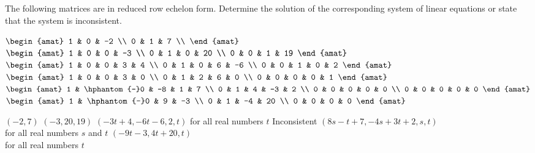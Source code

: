 
\begin{Exercise}[
name={},
title={}, 
difficulty=0,
origin={\cite{SZ}}]
The following matrices are in reduced row echelon form.  Determine the solution of the corresponding system of linear equations or state that the system is inconsistent.  


\begin{multicols}{2}
\Question $
\begin{amat}{2}
1 & 0 & -2 \\ 
0 & 1 & 7  \\ 
\end{amat}
$
\Question $
\begin{amat}{3}
1 & 0 & 0 & -3 \\ 
0 & 1 & 0 & 20 \\ 
0 & 0 & 1 & 19  
\end{amat}
$
\Question $
\begin{amat}{4}
1 & 0 & 0 & 3 & 4 \\ 
0 & 1 & 0 & 6 & -6 \\ 
0 & 0 & 1 & 0 & 2 
\end{amat}
$
\Question $
\begin{amat}{4}
1 & 0 & 0 & 3 & 0 \\ 
0 & 1 & 2 & 6 & 0 \\ 
0 & 0 & 0 & 0 & 1 
\end{amat}
$
\Question $
\begin{amat}{4}
1 & \hphantom{-}0 & -8 & 1 & 7 \\ 
0 & 1 & 4 & -3 & 2 \\ 
0 & 0 & 0 & 0 & 0 \\
0 & 0 & 0 & 0 & 0 
\end{amat}
$
\Question $
\begin{amat}{3}
1 & \hphantom{-}0 & 9 & -3 \\ 
0 & 1 & -4 & 20 \\ 
0 & 0 & 0 & 0  
\end{amat}
$
\EndCurrentQuestion
\end{multicols}
\end{Exercise}

\begin{Answer}
\Question $(-2, 7)$
\Question $(-3, 20, 19)$
\Question $(-3t + 4, -6t - 6, 2, t)$ for all real numbers $t$
\Question Inconsistent
\Question $(8s - t + 7, -4s + 3t + 2, s, t)$ \\ for all real numbers $s$ and $t$
\Question $(-9t - 3, 4t + 20, t)$ \\ for all real numbers $t$
\end{Answer}
